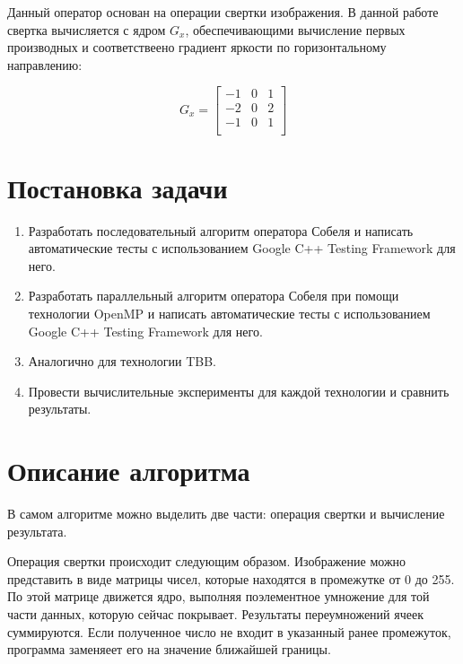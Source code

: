 \documentclass[12pt]{article}
\begin{document}
Данный оператор основан на операции свертки изображения. В данной работе свертка вычисляется с ядром \begin{math}G_x\end{math}, обеспечивающими вычисление первых производных и соответствеено градиент яркости по горизонтальному направлению:

\begin{equation}
G_x=
\left[
  \begin{array}{ccc}
    -1 & 0 & 1 \\
     -2 & 0 & 2 \\
     -1 & 0 & 1\\
  \end{array}
\right]
\end{equation}

\section*{Постановка задачи}

 \begin{enumerate} 
 \item Разработать последовательный алгоритм оператора Собеля и написать автоматические тесты с использованием Google C++ Testing Framework для него.
 \item Разработать параллельный алгоритм оператора Собеля при помощи технологии OpenMP и написать автоматические тесты с использованием Google C++ Testing Framework для него.
 \item Аналогично для технологии TBB.
 \item Провести вычислительные эксперименты для каждой технологии и сравнить результаты.
 \end{enumerate}


\newpage 
\section*{Описание алгоритма}
В самом алгоритме можно выделить две части: операция свертки и вычисление результата. 

Операция свертки происходит следующим образом. Изображение можно представить в виде матрицы чисел, которые находятся в промежутке от 0 до 255. По этой матрице движется ядро, выполняя поэлементное умножение для той части данных, которую сейчас покрывает. Результаты переумножений ячеек суммируются. Если полученное число не входит в указанный ранее промежуток, программа заменяеет его на значение ближайшей границы.
\end{document}
